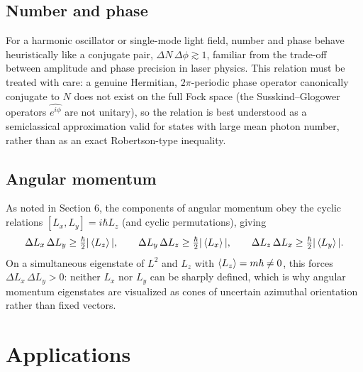 \documentclass[11pt]{article}
\theoremstyle{plain}
\theoremstyle{definition}
\theoremstyle{remark}
\begin{document}
\subsection{Number and phase}

For a harmonic oscillator or single-mode light field, number and phase behave heuristically like a
conjugate pair, $\Delta N\, \Delta\phi \gtrsim 1$, familiar from the trade-off between amplitude
and phase precision in laser physics. This relation must be treated with care: a genuine
Hermitian, $2\pi$-periodic phase operator canonically conjugate to $N$ does not exist on the full
Fock space (the Susskind--Glogower operators $\widehat{e^{i\phi}}$ are not unitary), so the
relation is best understood as a semiclassical approximation valid for states with large mean
photon number, rather than as an exact Robertson-type inequality.

\subsection{Angular momentum}

As noted in Section 6, the components of angular momentum obey the cyclic relations
$[L_x,L_y]=i\hbar L_z$ (and cyclic permutations), giving
\[
\Delta L_x\,\Delta L_y \geq \tfrac{\hbar}{2}|\expval{L_z}|, \qquad
\Delta L_y\,\Delta L_z \geq \tfrac{\hbar}{2}|\expval{L_x}|, \qquad
\Delta L_z\,\Delta L_x \geq \tfrac{\hbar}{2}|\expval{L_y}| .
\]
On a simultaneous eigenstate of $L^2$ and $L_z$ with $\expval{L_z}=m\hbar \neq 0$, this forces
$\Delta L_x\,\Delta L_y > 0$: neither $L_x$ nor $L_y$ can be sharply defined, which is why angular
momentum eigenstates are visualized as cones of uncertain azimuthal orientation rather than fixed
vectors.

\section{Applications}
\end{document}
